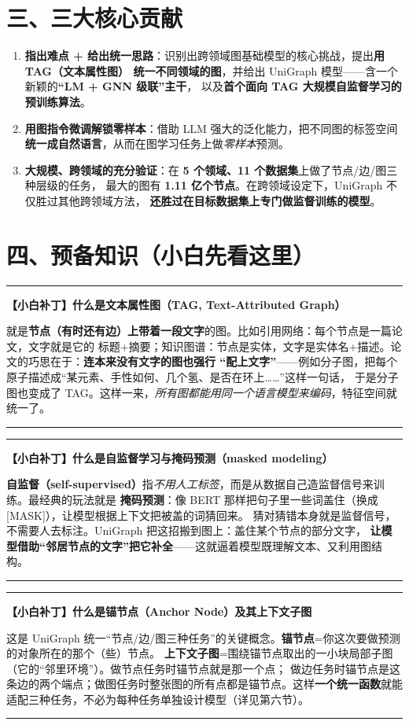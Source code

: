 \documentclass[11pt,UTF8,fontset=fandol]{ctexart}
\newenvironment{tip}[1]{%
  \par\smallskip\noindent\rule{\linewidth}{0.4pt}\par\nobreak
  \noindent\textbf{【小白补丁】#1}\par\nobreak\noindent\ignorespaces
}{%
  \par\noindent\rule{\linewidth}{0.4pt}\par\smallskip
}
\begin{document}
\section{三、三大核心贡献}
\begin{enumerate}[leftmargin=2em]
  \item \textbf{指出难点 + 给出统一思路}：识别出跨领域图基础模型的核心挑战，提出\textbf{用 TAG（文本属性图）
        统一不同领域的图}，并给出 UniGraph 模型——含一个新颖的\textbf{“LM + GNN 级联”主干}，
        以及\textbf{首个面向 TAG 大规模自监督学习的预训练算法}。
  \item \textbf{用图指令微调解锁零样本}：借助 LLM 强大的泛化能力，把不同图的标签空间
        \textbf{统一成自然语言}，从而在图学习任务上做\emph{零样本}预测。
  \item \textbf{大规模、跨领域的充分验证}：在 \textbf{5 个领域、11 个数据集}上做了节点/边/图三种层级的任务，
        最大的图有 \textbf{1.11 亿个节点}。在跨领域设定下，UniGraph 不仅胜过其他跨领域方法，
        \textbf{还胜过在目标数据集上专门做监督训练的模型}。
\end{enumerate}

\section{四、预备知识（小白先看这里）}

\begin{tip}{什么是文本属性图（TAG, Text-Attributed Graph）}
就是\textbf{节点（有时还有边）上带着一段文字}的图。比如引用网络：每个节点是一篇论文，文字就是它的
标题+摘要；知识图谱：节点是实体，文字是实体名+描述。论文的巧思在于：\textbf{连本来没有文字的图也强行
“配上文字”}——例如分子图，把每个原子描述成“某元素、手性如何、几个氢、是否在环上……”这样一句话，
于是分子图也变成了 TAG。这样一来，\emph{所有图都能用同一个语言模型来编码}，特征空间就统一了。
\end{tip}

\begin{tip}{什么是自监督学习与掩码预测（masked modeling）}
\textbf{自监督（self-supervised）}指\emph{不用人工标签}，而是从数据自己造监督信号来训练。最经典的玩法就是
\textbf{掩码预测}：像 BERT 那样把句子里一些词盖住（换成 [MASK]），让模型根据上下文把被盖的词猜回来。
猜对猜错本身就是监督信号，不需要人去标注。UniGraph 把这招搬到图上：盖住某个节点的部分文字，
\textbf{让模型借助“邻居节点的文字”把它补全}——这就逼着模型既理解文本、又利用图结构。
\end{tip}

\begin{tip}{什么是锚节点（Anchor Node）及其上下文子图}
这是 UniGraph 统一“节点/边/图三种任务”的关键概念。\textbf{锚节点}=你这次要做预测的对象所在的那个（些）节点。
\textbf{上下文子图}=围绕锚节点取出的一小块局部子图（它的“邻里环境”）。做节点任务时锚节点就是那一个点；
做边任务时锚节点是这条边的两个端点；做图任务时整张图的所有点都是锚节点。这样\textbf{一个统一函数}就能
适配三种任务，不必为每种任务单独设计模型（详见第六节）。
\end{tip}
\end{document}
